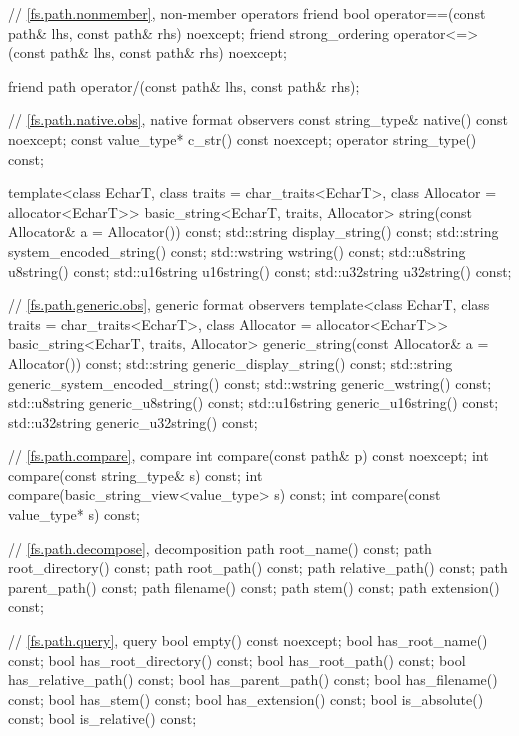 \begin{codeblock}
{{    // \ref{fs.path.nonmember}, non-member operators
    friend bool operator==(const path& lhs, const path& rhs) noexcept;
    friend strong_ordering operator<=>(const path& lhs, const path& rhs) noexcept;

    friend path operator/(const path& lhs, const path& rhs);

    // \ref{fs.path.native.obs}, native format observers
    const string_type& native() const noexcept;
    const value_type*  c_str() const noexcept;
    operator string_type() const;

    template<class EcharT, class traits = char_traits<EcharT>,
             class Allocator = allocator<EcharT>>
      basic_string<EcharT, traits, Allocator>
        string(const Allocator& a = Allocator()) const;
    std::string    display_string() const;
    std::string    system_encoded_string() const;
    std::wstring   wstring() const;
    std::u8string  u8string() const;
    std::u16string u16string() const;
    std::u32string u32string() const;

    // \ref{fs.path.generic.obs}, generic format observers
    template<class EcharT, class traits = char_traits<EcharT>,
             class Allocator = allocator<EcharT>>
      basic_string<EcharT, traits, Allocator>
        generic_string(const Allocator& a = Allocator()) const;
    std::string    generic_display_string() const;
    std::string    generic_system_encoded_string() const;
    std::wstring   generic_wstring() const;
    std::u8string  generic_u8string() const;
    std::u16string generic_u16string() const;
    std::u32string generic_u32string() const;

    // \ref{fs.path.compare}, compare
    int compare(const path& p) const noexcept;
    int compare(const string_type& s) const;
    int compare(basic_string_view<value_type> s) const;
    int compare(const value_type* s) const;

    // \ref{fs.path.decompose}, decomposition
    path root_name() const;
    path root_directory() const;
    path root_path() const;
    path relative_path() const;
    path parent_path() const;
    path filename() const;
    path stem() const;
    path extension() const;

    // \ref{fs.path.query}, query
    bool empty() const noexcept;
    bool has_root_name() const;
    bool has_root_directory() const;
    bool has_root_path() const;
    bool has_relative_path() const;
    bool has_parent_path() const;
    bool has_filename() const;
    bool has_stem() const;
    bool has_extension() const;
    bool is_absolute() const;
    bool is_relative() const;

}}
\end{codeblock}
